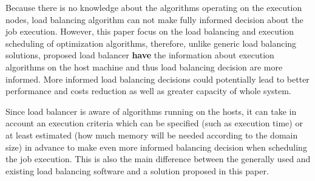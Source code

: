 Because there is no knowledge about the algorithms operating on the execution nodes,
load balancing algorithm can not make fully informed decision about the job execution.
However, this paper focus on the load balancing and execution scheduling of optimization algorithms,
therefore,
unlike generic load balancing solutions,
proposed load balancer \textbf{have} the information about execution algorithms on the host machine
and thus load balancing decision are more informed.
More informed load balancing decisions could potentially lead to better performance and costs reduction as well as greater capacity of whole system.

Since load balancer is aware of algorithms running on the hosts,
it can take in account an execution criteria which can be specified (such as execution time)
or at least estimated (how much memory will be needed according to the domain size) in advance to make even more informed balancing decision
when scheduling the job execution.
This is also the main difference between the generally used and existing load balancing software and a solution proposed in this paper.






















